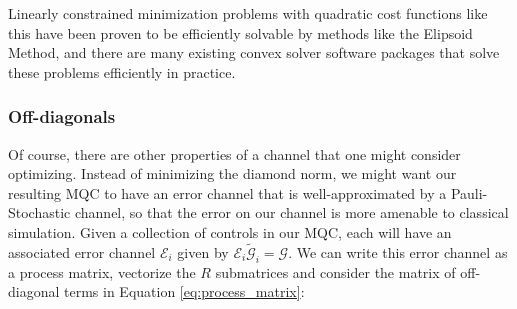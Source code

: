 \documentclass[aps,nofootinbib,pra,notitlepage,twocolumn]{revtex4-1}
\newcommand{\actual}{\ensuremath{\tilde{\mathcal{G}}}}
\newcommand{\target}{\ensuremath{{\mathcal{G}}}}
\newcommand{\error}{\ensuremath{{\mathcal{E}}}}
\begin{document}
Linearly constrained minimization problems with quadratic cost functions like this have been proven to be efficiently solvable by methods like the Elipsoid Method\cite{wright1999numerical, khachiyan}, and there are many existing convex solver software packages that solve these problems efficiently in practice.






\subsubsection{Off-diagonals} %
\label{sub:off_diagonals}
Of course, there are other properties of a channel that one might consider optimizing. Instead of minimizing the diamond norm, we might want our resulting MQC to have an error channel that is well-approximated by a Pauli-Stochastic channel, so that the error on our channel is more amenable to classical simulation. Given a collection of controls in our MQC, each will have an associated error channel $\error_i$ given by $\error_i\actual_i=\target$. We can write this error channel as a process matrix, vectorize the $R$ submatrices and consider the matrix of off-diagonal terms in Equation \ref{eq:process_matrix}:
\end{document}
